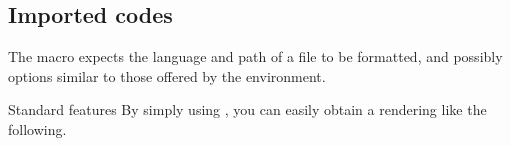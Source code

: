 \documentclass{tutodoc}
\begin{document}
\subsection{Imported codes}

The  macro expects the language and path of a file to be formatted, and possibly options similar to those offered by the  environment.


\begin{tdocexa}{Standard features}
	By simply using , you can easily obtain a rendering like the following.

\end{tdocexa}


\begin{tdocexa}
	\leavevmode
\end{tdocexa}
\end{document}
